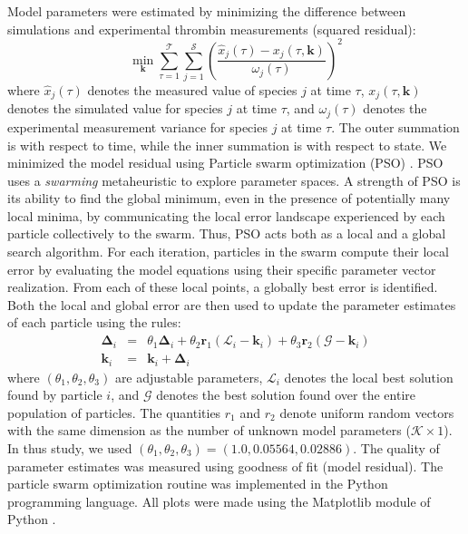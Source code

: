 \documentclass[processes,article,received,moreauthors,pdftex,12pt,a4paper]{mdpi}
\begin{document}
Model parameters were estimated by minimizing the difference between simulations and experimental thrombin measurements (squared residual):
\begin{equation}\label{eqn:objective-function}
	\min_{\mathbf{k}} \sum_{\tau=1}^{\mathcal{T}}\sum_{j=1}^{\mathcal{S}}\left(\frac{\hat{x}_{j}\left(\tau\right) - x_{j}\left(\tau,\mathbf{k}\right)}{\omega_{j}\left(\tau\right)}\right)^{2}
\end{equation}where $\hat{x}_{j}\left(\tau\right)$ denotes the measured value of species $j$ at time $\tau$, $x_{j}\left(\tau,\mathbf{k}\right)$ denotes the simulated 
value for species $j$ at time $\tau$, and $\omega_{j}\left(\tau\right)$ denotes the experimental measurement variance for species $j$ at time $\tau$. The outer summation is with respect to
time, while the inner summation is with respect to state. We minimized the model residual using Particle swarm optimization (PSO) \citep{PSO}.
PSO uses a \textit{swarming} metaheuristic to explore parameter spaces. 
A strength of PSO is its ability to find the global minimum, even in the presence of potentially many local minima, by communicating the local
error landscape experienced by each particle collectively to the swarm. Thus, PSO acts both as a local and a global search algorithm. 
For each iteration, particles in the swarm compute their local error by evaluating the model equations using their specific parameter vector realization.
From each of these local points, a globally best error is identified. Both the local and global error 
are then used to update the parameter estimates of each particle using the rules:
\begin{eqnarray}
	\mathbf{\Delta}_{i} &=&\theta_{1}\mathbf{\Delta}_{i} + \theta_{2}\mathbf{r}_{1}\left(\mathcal{L}_{i} - \mathbf{k}_{i}\right) + \theta_{3}\mathbf{r}_{2}\left(\mathcal{G} - \mathbf{k}_{i}\right) \\
	\mathbf{k}_{i} &=& \mathbf{k}_{i} + \mathbf{\Delta}_{i}
\end{eqnarray}where $\left(\theta_{1},\theta_{2},\theta_{3}\right)$ are adjustable parameters, $\mathcal{L}_{i}$ denotes the local best solution found by particle $i$, and
$\mathcal{G}$ denotes the best solution found over the entire population of particles. The quantities $r_{1}$ and $r_{2}$ denote uniform random vectors with the same dimension as the number of unknown model
parameters ($\mathcal{K}\times{1}$). In thus study, we used $\left(\theta_{1},\theta_{2},\theta_{3}\right) = \left(1.0, 0.05564, 0.02886\right)$. The quality of parameter
estimates was measured using goodness of fit (model residual). The particle swarm optimization routine was implemented in the Python programming language. 
All plots were made using the Matplotlib module of Python \citep{Matplotlib}.
\end{document}
